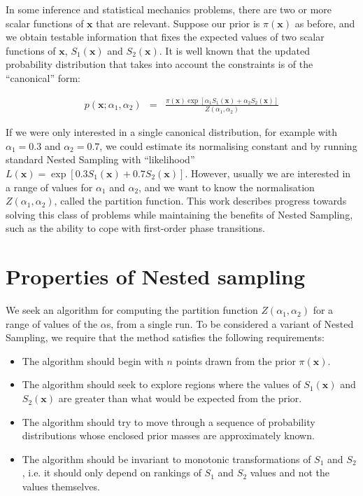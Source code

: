 \documentclass[a4paper, 11pt]{article}
\newcommand{\xx}{\mathbf{x}}	%
\begin{document}
In some inference and
statistical mechanics problems, there are two or more scalar functions of
$\xx$ that are relevant. Suppose our prior is $\pi(\xx)$ as before, and
we obtain testable information that fixes the expected values of two scalar
functions of $\xx$, $S_1(\xx)$ and $S_2(\xx)$. It is well known that the
updated probability distribution that takes into account the constraints is
of the ``canonical'' form:

\begin{eqnarray}
p(\xx; \alpha_1, \alpha_2) &=& \frac{\pi(\xx)\exp\left[\alpha_1S_1(\xx)+\alpha_2S_2(\xx)\right]}
{Z(\alpha_1, \alpha_2)}
\end{eqnarray}

If we were only interested in a single canonical distribution, for example
with $\alpha_1 = 0.3$ and $\alpha_2 = 0.7$, we could estimate its normalising
constant and by running standard Nested Sampling with ``likelihood''
$L(\xx) = \exp\left[0.3S_1(\xx) + 0.7S_2(\xx)\right]$. However, usually we
are interested in a range of values for $\alpha_1$ and $\alpha_2$, and we
want to know the normalisation $Z(\alpha_1, \alpha_2)$, called the
partition function. This work describes
progress towards solving this class of problems while maintaining the benefits
of Nested Sampling, such as the ability to cope with first-order phase
transitions.

\section{Properties of Nested sampling}
We seek an algorithm for computing the partition function
$Z(\alpha_1, \alpha_2)$ for a range of values of the $\alpha$s, from a single
run. To be considered a variant of Nested Sampling, we require that the method
satisfies the following requirements:
\begin{itemize}
\item The algorithm should begin with $n$ points drawn from the prior $\pi(\xx)$.
\item The algorithm should seek to explore regions where the values of
$S_1(\xx)$ and $S_2(\xx)$ are greater than what would be expected from the
prior.
\item The algorithm should try to move through a sequence of probability
distributions whose enclosed prior masses are approximately known.
\item The algorithm should be invariant to monotonic transformations of
$S_1$ and $S_2$, i.e. it should only depend on rankings of $S_1$ and $S_2$
values and not the values themselves.
\end{itemize}
\end{document}
